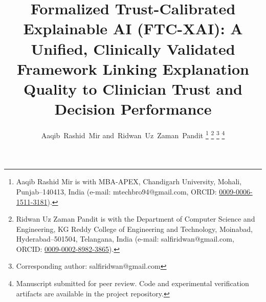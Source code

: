 \documentclass[10pt,journal,compsoc]{IEEEtran}
\begin{document}
\title{Formalized Trust-Calibrated Explainable AI (FTC-XAI): A Unified, Clinically Validated Framework Linking Explanation Quality to Clinician Trust and Decision Performance}

\author{
    Aaqib~Rashid~Mir
    and~Ridwan~Uz~Zaman~Pandit\IEEEauthorrefmark{*}%
    \thanks{Aaqib Rashid Mir is with MBA-APEX, Chandigarh University, Mohali, Punjab--140413, India (e-mail: mtechbro94@gmail.com, ORCID: \href{https://orcid.org/0009-0006-1511-3181}{0009-0006-1511-3181}).}
    \thanks{Ridwan Uz Zaman Pandit is with the Department of Computer Science and Engineering, KG Reddy College of Engineering and Technology, Moinabad, Hyderabad--501504, Telangana, India (e-mail: salfiridwan@gmail.com, ORCID: \href{https://orcid.org/0009-0002-8982-3865}{0009-0002-8982-3865}).}
    \thanks{\IEEEauthorrefmark{*}Corresponding author: salfiridwan@gmail.com}
    \thanks{Manuscript submitted for peer review. Code and experimental verification artifacts are available in the project repository.}
}

\end{document}
